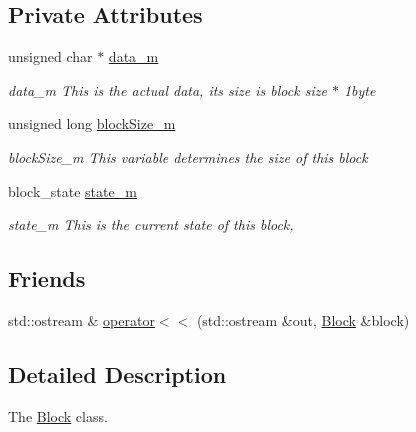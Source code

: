 \subsection*{Private Attributes}
\begin{DoxyCompactItemize}
\item 
\mbox{\label{classcore_1_1logic_1_1_block_a704a6ec407b3c0de27f7e6f611617b2f}} 
unsigned char $\ast$ \mbox{\hyperlink{classcore_1_1logic_1_1_block_a704a6ec407b3c0de27f7e6f611617b2f}{data\+\_\+m}}
\begin{DoxyCompactList}\small\item\em data\+\_\+m This is the actual data, its size is block size $\ast$ 1byte \end{DoxyCompactList}\item 
\mbox{\label{classcore_1_1logic_1_1_block_a3712fd09b73523496bf1b01f6cf4fad5}} 
unsigned long \mbox{\hyperlink{classcore_1_1logic_1_1_block_a3712fd09b73523496bf1b01f6cf4fad5}{block\+Size\+\_\+m}}
\begin{DoxyCompactList}\small\item\em block\+Size\+\_\+m This variable determines the size of this block \end{DoxyCompactList}\item 
block\+\_\+state \mbox{\hyperlink{classcore_1_1logic_1_1_block_ae641fe8a68a54bdfa883c314375e6b6b}{state\+\_\+m}}
\begin{DoxyCompactList}\small\item\em state\+\_\+m This is the current state of this block, \end{DoxyCompactList}\end{DoxyCompactItemize}
\subsection*{Friends}
\begin{DoxyCompactItemize}
\item 
std\+::ostream \& \mbox{\hyperlink{classcore_1_1logic_1_1_block_a822a522e43e47d065d5c56a2103e08a3}{operator$<$$<$}} (std\+::ostream \&out, \mbox{\hyperlink{classcore_1_1logic_1_1_block}{Block}} \&block)
\end{DoxyCompactItemize}


\subsection{Detailed Description}
The \mbox{\hyperlink{classcore_1_1logic_1_1_block}{Block}} class. 


